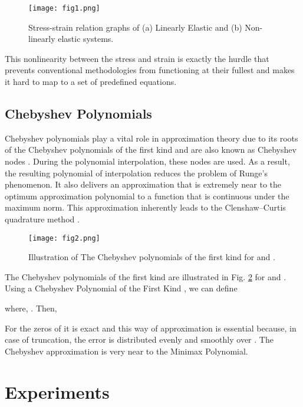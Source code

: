 \documentclass[conference]{IEEEtran}
\begin{document}
\begin{figure}[htbp]
\centerline{\texttt{[image: fig1.png]}}
\caption{Stress-strain relation graphs of (a) Linearly Elastic and (b) Non-linearly elastic systems.}
\label{fig1}
\end{figure}

This nonlinearity between the stress and strain is exactly the hurdle that prevents conventional methodologies from functioning at their fullest and makes it hard to map to a set of predefined equations.

\subsection{Chebyshev Polynomials}
Chebyshev polynomials play a vital role in approximation theory \cite{20} due to its roots of the Chebyshev polynomials of the first kind and are also known as Chebyshev nodes \cite{21}. During the polynomial interpolation, these nodes are used. As a result, the resulting polynomial of interpolation reduces the problem of Runge's phenomenon. It also delivers an approximation that is extremely near to the optimum approximation polynomial to a function that is continuous under the maximum norm. This approximation inherently leads to the Clenshaw–Curtis quadrature method \cite{22}. 

\begin{figure}[htbp]
\centerline{\texttt{[image: fig2.png]}}
\caption{Illustration of The Chebyshev polynomials of the first kind  for  and .}
\label{fig2}
\end{figure}

The Chebyshev polynomials of the first kind  are illustrated in Fig. \ref{fig2} for  and . Using a Chebyshev Polynomial of the First Kind , we can define 




where, . Then, 



For the  zeros of  it is exact and this way of approximation is essential because, in case of truncation, the error is distributed evenly and smoothly over . The Chebyshev approximation \cite{23,30} is very near to the Minimax Polynomial. 

\section{Experiments}
\label{experiments}
\end{document}
